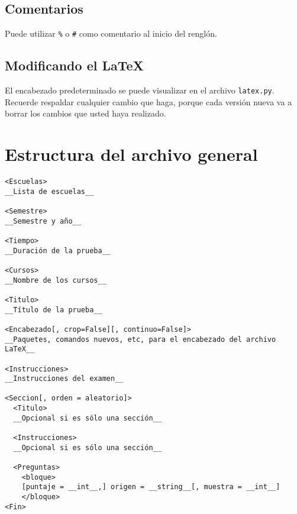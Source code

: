\documentclass[12pt]{article}
\theoremstyle{definition}
\begin{document}
\subsection{Comentarios}
Puede utilizar \verb|%| o \verb|#| como comentario al inicio del renglón.

\subsection{Modificando el \LaTeX}
El encabezado predeterminado se puede visualizar en el archivo \verb|latex.py|. Recuerde respaldar cualquier cambio que haga, porque cada versión nueva va a borrar los cambios que usted haya realizado.

\section{Estructura del archivo general}
\small
\begin{verbatim}
<Escuelas>
__Lista de escuelas__

<Semestre>
__Semestre y año__

<Tiempo>
__Duración de la prueba__

<Cursos>
__Nombre de los cursos__

<Titulo>
__Título de la prueba__

<Encabezado[, crop=False][, continuo=False]>
__Paquetes, comandos nuevos, etc, para el encabezado del archivo LaTeX__

<Instrucciones>
__Instrucciones del examen__

<Seccion[, orden = aleatorio]>
  <Titulo>
  __Opcional si es sólo una sección__

  <Instrucciones>
  __Opcional si es sólo una sección__

  <Preguntas>
    <bloque>
    [puntaje = __int__,] origen = __string__[, muestra = __int__]
    </bloque>
<Fin>
\end{verbatim}
\normalsize
\end{document}
